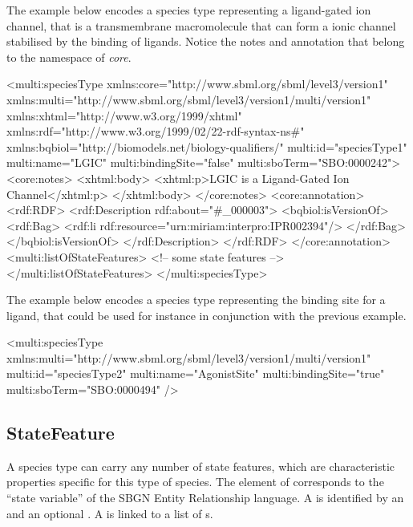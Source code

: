 The example below encodes a species type representing a ligand-gated ion channel, that is a transmembrane macromolecule that can form a ionic channel stabilised by the binding of ligands. Notice the notes and annotation that belong to the namespace of \sbmlLthreeVone \emph{core}.

\begin{example}
<multi:speciesType xmlns:core="http://www.sbml.org/sbml/level3/version1"
                   xmlns:multi="http://www.sbml.org/sbml/level3/version1/multi/version1" 
                   xmlns:xhtml="http://www.w3.org/1999/xhtml"
                   xmlns:rdf="http://www.w3.org/1999/02/22-rdf-syntax-ns#" 
                   xmlns:bqbiol="http://biomodels.net/biology-qualifiers/"
                   multi:id="speciesType1"
                   multi:name="LGIC"
                   multi:bindingSite="false" 
                   multi:sboTerm="SBO:0000242">
  <core:notes>
    <xhtml:body>
      <xhtml:p>LGIC is a Ligand-Gated Ion Channel</xhtml:p>
    </xhtml:body>
  </core:notes>
  <core:annotation>
    <rdf:RDF>
      <rdf:Description rdf:about="#_000003">
        <bqbiol:isVersionOf>
          <rdf:Bag>
            <rdf:li rdf:resource="urn:miriam:interpro:IPR002394"/>
          </rdf:Bag>
        </bqbiol:isVersionOf>
      </rdf:Description>
    </rdf:RDF>
  </core:annotation>
  <multi:listOfStateFeatures>
    <!-- some state features -->
  </multi:listOfStateFeatures>
</multi:speciesType>
\end{example}

The example below encodes a species type representing the binding site for a ligand, that could be used for instance in conjunction with the previous example. 

\begin{example}
<multi:speciesType xmlns:multi="http://www.sbml.org/sbml/level3/version1/multi/version1" 
                   multi:id="speciesType2"
                   multi:name="AgonistSite" 
                   multi:bindingSite="true" 
                   multi:sboTerm="SBO:0000494" />
\end{example}

\subsection{StateFeature} 

A species type can carry any number of state features, which are characteristic properties specific for this type of species. The element  of \sbmlLthreeVone \multiVone corresponds to the ``state variable'' of the SBGN Entity Relationship language. A  is identified by an  and an optional . A  is linked to a list of s.

